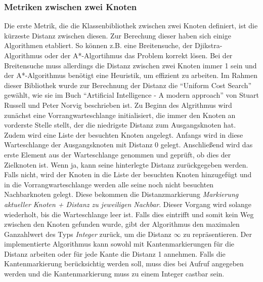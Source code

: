 \documentclass[a4paper,12pt,ngerman,chapterprefix=false,listof=totoc,bibliography=totoc]{scrreprt}
\begin{document}
{{\subsubsection*{Metriken zwischen zwei Knoten}
{
Die erste Metrik, die die Klassenbibliothek zwischen zwei Knoten definiert, ist die kürzeste Distanz zwischen diesen. Zur Berechung dieser haben sich einige Algorithmen etabliert. So können z.B. eine Breitensuche, der Djikstra-Algorithmus oder der A*-Algortihmus das Problem korrekt lösen. Bei der Breitensuche muss allerdings die Distanz zwischen zwei Knoten immer 1 sein und der A*-Algorithmus benötigt eine Heuristik, um effizient zu arbeiten. Im Rahmen dieser Bibliothek wurde zur Berechnung der Distanz die "`Uniform Cost Search"' gewählt, wie sie im Buch "`Artificial Intelligence - A modern approach"' von Stuart Russell und Peter Norvig beschrieben ist. Zu Beginn des Algrithmus wird zunächst eine Vorrangwarteschlange initialisiert, die immer den Knoten an vorderste Stelle stellt, der die niedrigste Distanz zum Ausgangsknoten hat. Zudem wird eine Liste der besuchten Knoten angelegt. Anfangs wird in diese Warteschlange der Ausgangsknoten mit Distanz 0 gelegt. Anschließend wird das erste Element aus der Warteschlange genommen und geprüft, ob dies der Zielknoten ist. Wenn ja, kann seine hinterlegte Distanz zurückgegeben werden. Falls nicht, wird der Knoten in die Liste der besuchten Knoten hinzugefügt und in die Vorrangwarteschlange werden alle seine noch nicht besuchten Nachbarknoten gelegt. Diese bekommen die Distanzmarkierung \textit{Markierung aktueller Knoten + Distanz zu jeweiligen Nachbar}. Dieser Vorgang wird solange wiederholt, bis die Warteschlange leer ist. Falls dies eintrifft und somit kein Weg zwischen den Knoten gefunden wurde, gibt der Algorithmus den maximalen Ganzahlwert des Typs \textit{Integer} zurück, um die Distanz \(\infty\) zu repräsentieren. Der implementierte Algorithmus kann sowohl mit Kantenmarkierungen für die Distanz arbeiten oder für jede Kante die Distanz 1 annehmen. Falls die Kantenmarkierung berücksichtig werden soll, muss dies bei Aufruf angegeben werden und die Kantenmarkierung muss zu einem Integer castbar sein. \cite{russell_artificial_2016}

}}}
\end{document}
